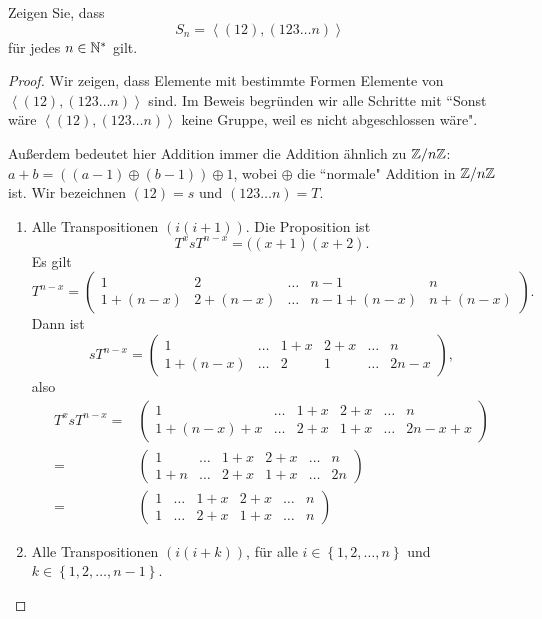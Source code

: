 \begin{Problem}
	Zeigen Sie, dass
	\[
	S_n=\left<(12),(123\dots n) \right>\] 
	f\"{u}r jedes $n\in \mathbb{N}^*$ gilt.
\end{Problem}
\begin{proof}
	Wir zeigen, dass Elemente mit bestimmte Formen Elemente von $\left<(12),(123\dots n) \right>$ sind. Im Beweis begründen wir alle Schritte mit ``Sonst wäre $\left<(12),(123\dots n) \right>$ keine Gruppe, weil es nicht abgeschlossen wäre".

	Außerdem bedeutet hier Addition immer die Addition ähnlich zu $\mathbb{Z} / n \mathbb{Z}$: $a+b=((a-1)\oplus(b-1))\oplus 1$, wobei $\oplus$ die ``normale" Addition in $\mathbb{Z} / n\mathbb{Z}$ ist. Wir bezeichnen $(12)=s$ und $(123\dots n)=T$. 
	\begin{enumerate}[label=(\roman*)]
		\item Alle Transpositionen $(i(i+1))$. Die Proposition ist
			\[
				T^{x}sT^{n-x}=((x+1)(x+2)
			.\] 
			Es gilt
			\[
				T^{n-x}=\begin{pmatrix} 1 & 2 & \dots & n-1 & n \\ 1+(n-x) & 2+(n-x) & \dots & n-1+(n-x) & n+(n-x) \end{pmatrix} 
			.\]
			Dann ist
			\[
				sT^{n-x}=\begin{pmatrix} 1 & \dots & 1+x & 2 + x & \dots & n\\
				1+(n-x) & \dots & 2 & 1 & \dots & 2n-x\end{pmatrix} 
			,\] 
			also
			\begin{align*}
				T^xsT^{n-x}=& \begin{pmatrix} 1 & \dots & 1+x & 2+x & \dots & n \\ 1+(n-x)+x & \dots & 2+x & 1+x & \dots & 2n-x+x \end{pmatrix} \\
				=& \begin{pmatrix}  1 & \dots & 1+x & 2+x & \dots & n \\ 1 + n & \dots & 2 + x & 1 + x & \dots & 2n \end{pmatrix} \\
				=& \begin{pmatrix} 1 & \dots & 1+x & 2+x & \dots & n \\ 1 & \dots & 2+x & 1+x & \dots & n \end{pmatrix} 
			\end{align*}
		\item Alle Transpositionen $(i(i+k))$, f\"{u}r alle $i\in \left\{ 1,2,\dots, n \right\} $ und $k\in \left\{ 1,2,\dots,n-1 \right\} $.


\end{enumerate}
\end{proof}
